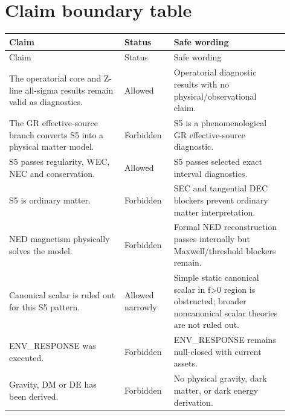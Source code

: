 \documentclass[11pt,a4paper]{article}
\begin{document}
\section{Claim boundary table}

\footnotesize
\begin{longtable}{p{0.38\linewidth}p{0.16\linewidth}p{0.38\linewidth}}
\toprule
Claim & Status & Safe wording \\
\midrule
\endfirsthead
\toprule
Claim & Status & Safe wording \\
\midrule
\endhead
The operatorial core and Z-line all-sigma results remain valid as diagnostics. & Allowed & Operatorial diagnostic results with no physical/observational claim. \\
The GR effective-source branch converts S5 into a physical matter model. & Forbidden & S5 is a phenomenological GR effective-source diagnostic. \\
S5 passes regularity, WEC, NEC and conservation. & Allowed & S5 passes selected exact interval diagnostics. \\
S5 is ordinary matter. & Forbidden & SEC and tangential DEC blockers prevent ordinary matter interpretation. \\
NED magnetism physically solves the model. & Forbidden & Formal NED reconstruction passes internally but Maxwell/threshold blockers remain. \\
Canonical scalar is ruled out for this S5 pattern. & Allowed narrowly & Simple static canonical scalar in f>0 region is obstructed; broader noncanonical scalar theories are not ruled out. \\
ENV\_RESPONSE was executed. & Forbidden & ENV\_RESPONSE remains null-closed with current assets. \\
Gravity, DM or DE has been derived. & Forbidden & No physical gravity, dark matter, or dark energy derivation. \\
\bottomrule
\end{longtable}
\normalsize
\end{document}

